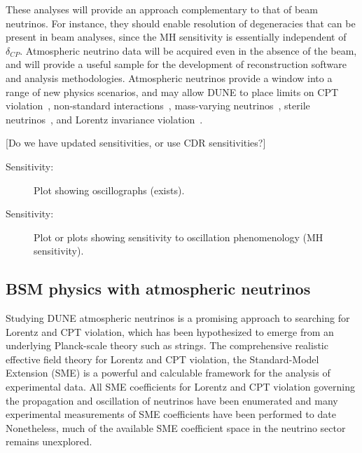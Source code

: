 These analyses will provide an approach complementary to that of beam neutrinos. 
For instance, they should enable resolution of 
degeneracies that can be present in beam analyses, since %
the MH sensitivity is essentially independent of $\delta_{CP}$.   Atmospheric neutrino data will be acquired 
even in the absence of the beam, and will provide a useful sample for the development of 
reconstruction software and analysis methodologies.  
Atmospheric neutrinos provide a window into a range of new physics scenarios, and %
may allow DUNE to place limits on CPT violation~\cite{Kostelecky:2003cr}, 
non-standard interactions~\cite{Chatterjee:2014gxa}, mass-varying neutrinos~\cite{Abe:2008zza}, 
sterile neutrinos~\cite{Abe:2014gda}, and
Lorentz invariance violation~\cite{Kostelecky:2011gq}.

[Do we have updated sensitivities, or use CDR sensitivities?]

\begin{description}
\item[Sensitivity:] Plot showing oscillographs (exists). 
\item[Sensitivity:] Plot or plots showing sensitivity to oscillation phenomenology (MH sensitivity). 
\end{description}


\subsection{BSM physics with atmospheric neutrinos}
\label{sec:nonaccel-atm-bsm}


Studying DUNE atmospheric neutrinos is a promising approach
to searching for Lorentz and CPT violation,
which has been hypothesized
to emerge from an underlying Planck-scale theory such as strings.
The comprehensive realistic effective field theory
for Lorentz and CPT violation,
the Standard-Model Extension (SME)
is a powerful and calculable framework
for the analysis of experimental data.
All SME coefficients for Lorentz and CPT violation
governing the propagation and oscillation of neutrinos
have been enumerated 
and many experimental measurements of SME coefficients 
have been performed to date
Nonetheless,
much of the available SME coefficient space 
in the neutrino sector remains unexplored.

